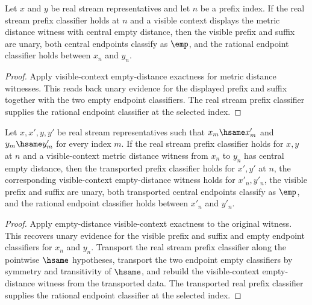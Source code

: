 \begin{theorem}
\label{thm:completion-metric-distance-visible-context-empty-distance-real-prefix-readback}
Let $x$ and $y$ be real stream representatives and let $n$ be a prefix
index. If the real stream prefix classifier holds at $n$ and a visible
context displays the metric distance witness with central empty distance,
then the visible prefix and suffix are unary, both central endpoints classify
as $\emp$, and the rational endpoint classifier holds between $x_n$ and
$y_n$.
\end{theorem}
\begin{proof}
Apply visible-context empty-distance exactness for metric distance witnesses.
This reads back unary evidence for the displayed prefix and suffix together
with the two empty endpoint classifiers. The real stream prefix classifier
supplies the rational endpoint classifier at the selected index.
\end{proof}

\begin{theorem}
\label{thm:completion-visible-context-empty-distance-hsame-transport}
Let $x,x',y,y'$ be real stream representatives such that
$x_m\hsame x'_m$ and $y_m\hsame y'_m$ for every index $m$. If the real stream
prefix classifier holds for $x,y$ at $n$ and a visible-context metric distance
witness from $x_n$ to $y_n$ has central empty distance, then the transported
prefix classifier holds for $x',y'$ at $n$, the corresponding visible-context
empty-distance witness holds for $x'_n,y'_n$, the visible prefix and suffix are
unary, both transported central endpoints classify as $\emp$, and the rational
endpoint classifier holds between $x'_n$ and $y'_n$.
\end{theorem}
\begin{proof}
Apply empty-distance visible-context exactness to the original witness. This
recovers unary evidence for the visible prefix and suffix and empty endpoint
classifiers for $x_n$ and $y_n$. Transport the real stream prefix classifier
along the pointwise $\hsame$ hypotheses, transport the two endpoint empty
classifiers by symmetry and transitivity of $\hsame$, and rebuild the
visible-context empty-distance witness from the transported data. The
transported real prefix classifier supplies the rational endpoint classifier at
the selected index.
\end{proof}

